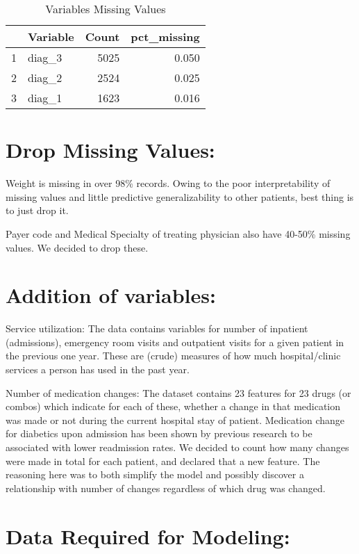 \documentclass[11pt,]{article}
\begin{document}
\begin{table}

\caption{\label{tab:p7}Variables Missing Values}
\centering
\begin{tabular}[t]{l|l|r|r}
\hline
  & Variable & Count & pct\_missing\\
\hline
1 & diag\_3 & 5025 & 0.050\\
\hline
2 & diag\_2 & 2524 & 0.025\\
\hline
3 & diag\_1 & 1623 & 0.016\\
\hline
\end{tabular}
\end{table}

\section{Drop Missing Values:}\label{drop-missing-values}

Weight is missing in over 98\% records. Owing to the poor
interpretability of missing values and little predictive
generalizability to other patients, best thing is to just drop it.

Payer code and Medical Specialty of treating physician also have 40-50\%
missing values. We decided to drop these.

\section{Addition of variables:}\label{addition-of-variables}

Service utilization: The data contains variables for number of inpatient
(admissions), emergency room visits and outpatient visits for a given
patient in the previous one year. These are (crude) measures of how much
hospital/clinic services a person has used in the past year.

Number of medication changes: The dataset contains 23 features for 23
drugs (or combos) which indicate for each of these, whether a change in
that medication was made or not during the current hospital stay of
patient. Medication change for diabetics upon admission has been shown
by previous research to be associated with lower readmission rates. We
decided to count how many changes were made in total for each patient,
and declared that a new feature. The reasoning here was to both simplify
the model and possibly discover a relationship with number of changes
regardless of which drug was changed.

\section{Data Required for Modeling:}\label{data-required-for-modeling}
\end{document}
